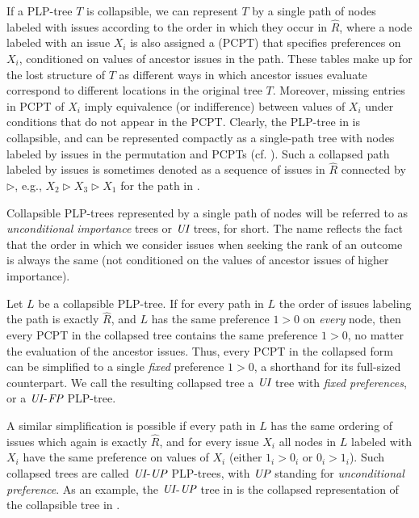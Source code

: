 If a PLP-tree $T$ is collapsible, we can represent $T$ by a single path
of nodes labeled with issues according to the order in which they occur
in $\hat{R}$, 
where a node labeled with an issue $X_i$ is also assigned a
 (PCPT) that specifies 
preferences on $X_i$, conditioned on values of ancestor issues in the path.
These tables make up for the lost structure of $T$ as different ways in 
which ancestor issues evaluate correspond to different locations 
in the original tree $T$. 
Moreover, missing entries in PCPT of $X_i$ imply equivalence (or indifference) between values of $X_i$
under conditions that do not appear in the PCPT.
Clearly, the PLP-tree in  is collapsible, and can
be represented compactly as a single-path tree with nodes labeled by 
issues in the permutation and PCPTs (cf. ).
Such a collapsed path labeled by issues is sometimes denoted as
a sequence of issues in $\hat{R}$ connected by $\triangleright$, e.g.,
$X_2\triangleright X_3\triangleright X_1$ for the path in .

Collapsible PLP-trees represented by a single path of nodes 
will be referred to as \emph{unconditional importance} trees or $\textit{UI}$ 
trees, for short. The name reflects the fact that the order in which 
we consider issues when seeking the rank of an outcome is always the 
same (not conditioned on the values of ancestor issues of higher importance).

Let $L$ be a collapsible PLP-tree.
If for every path in $L$ the order of issues labeling the path is exactly $\hat{R}$,
and $L$ has the same preference $1>0$ on \emph{every} node,
then every PCPT in the collapsed tree contains the same preference $1>0$,
no matter the evaluation of the ancestor issues.
Thus, every PCPT in the collapsed form can be simplified to a single \emph{fixed} preference $1>0$,
a shorthand for its full-sized counterpart.
We call the resulting
collapsed tree a $\textit{UI}$ tree with \emph{fixed preferences}, or a $\textit{UI}$-$\textit{FP}$ PLP-tree.

A similar simplification is possible if every path in $L$ has the same ordering of issues
which again is exactly $\hat{R}$, and
for every issue $X_i$ all nodes in $L$ labeled with $X_i$ have the same
preference on values of $X_i$ (either $1_i>0_i$ or $0_i>1_i$).
Such collapsed 
trees are called $\textit{UI}$-$\textit{UP}$ PLP-trees, with $\textit{UP}$ standing for \emph{unconditional 
preference}. As an example, the $\textit{UI}$-$\textit{UP}$ tree in 
is the collapsed representation of the collapsible tree in .

